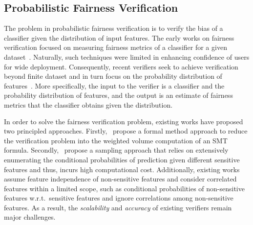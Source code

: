 \subsection{Probabilistic Fairness Verification} The problem in probabilistic fairness verification is to verify the bias of a classifier given the distribution of input features. The early works on fairness verification focused on measuring fairness metrics of a classifier for a given dataset~\cite{aif360-oct-2018}. Naturally, such techniques were limited in enhancing confidence of users for wide deployment. Consequently, recent verifiers seek to achieve verification beyond  finite dataset and in turn focus on the  probability distribution of features~\cite{albarghouthi2017fairsquare, bastani2019probabilistic}.  More specifically, the input to the verifier is a classifier and  the probability distribution of features, and the output is an estimate of fairness metrics that the classifier obtains given the distribution.


In order to solve the fairness verification problem, existing works have proposed two principled approaches.	Firstly,~\cite{albarghouthi2017fairsquare} propose a formal method approach to reduce the verification problem into the weighted volume computation of an SMT formula. Secondly,~\cite{bastani2019probabilistic} propose a sampling approach that relies on extensively enumerating the conditional probabilities of prediction given different sensitive features and thus, incurs high computational cost. Additionally, existing works assume feature independence of non-sensitive features and consider correlated features within a limited scope, such as conditional probabilities of non-sensitive features w.r.t.\ sensitive features and ignore correlations among non-sensitive features. As a result, the \textit{scalability} and \textit{accuracy} of existing  verifiers remain major challenges.


